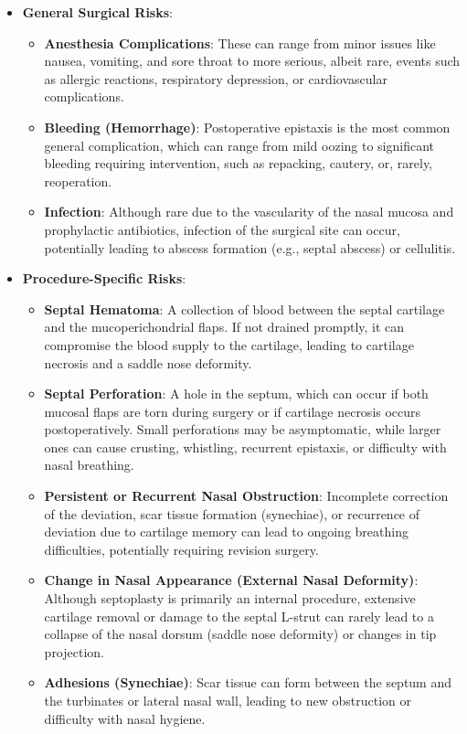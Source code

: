 \begin{itemize}
  \item \textbf{General Surgical Risks}:
    \begin{itemize}
      \item \textbf{Anesthesia Complications}: These can range from minor issues like nausea, vomiting, and sore throat to more serious, albeit rare, events such as allergic reactions, respiratory depression, or cardiovascular complications.
      \item \textbf{Bleeding (Hemorrhage)}: Postoperative epistaxis is the most common general complication, which can range from mild oozing to significant bleeding requiring intervention, such as repacking, cautery, or, rarely, reoperation.
      \item \textbf{Infection}: Although rare due to the vascularity of the nasal mucosa and prophylactic antibiotics, infection of the surgical site can occur, potentially leading to abscess formation (e.g., septal abscess) or cellulitis.
    \end{itemize}
  \item \textbf{Procedure-Specific Risks}:
    \begin{itemize}
      \item \textbf{Septal Hematoma}: A collection of blood between the septal cartilage and the mucoperichondrial flaps. If not drained promptly, it can compromise the blood supply to the cartilage, leading to cartilage necrosis and a saddle nose deformity.
      \item \textbf{Septal Perforation}: A hole in the septum, which can occur if both mucosal flaps are torn during surgery or if cartilage necrosis occurs postoperatively. Small perforations may be asymptomatic, while larger ones can cause crusting, whistling, recurrent epistaxis, or difficulty with nasal breathing.
      \item \textbf{Persistent or Recurrent Nasal Obstruction}: Incomplete correction of the deviation, scar tissue formation (synechiae), or recurrence of deviation due to cartilage memory can lead to ongoing breathing difficulties, potentially requiring revision surgery.
      \item \textbf{Change in Nasal Appearance (External Nasal Deformity)}: Although septoplasty is primarily an internal procedure, extensive cartilage removal or damage to the septal L-strut can rarely lead to a collapse of the nasal dorsum (saddle nose deformity) or changes in tip projection.
      \item \textbf{Adhesions (Synechiae)}: Scar tissue can form between the septum and the turbinates or lateral nasal wall, leading to new obstruction or difficulty with nasal hygiene.

\end{itemize}
\end{itemize}
